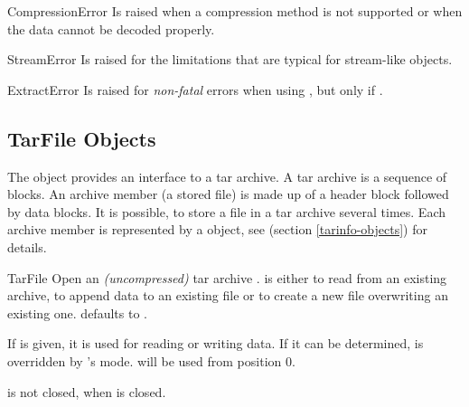 \begin{excdesc}{CompressionError}
    Is raised when a compression method is not supported or when the data
    cannot be decoded properly.
\end{excdesc}

\begin{excdesc}{StreamError}
    Is raised for the limitations that are typical for stream-like
     objects.
\end{excdesc}

\begin{excdesc}{ExtractError}
    Is raised for \emph{non-fatal} errors when using , but
    only if .
\end{excdesc}

\begin{seealso}

\end{seealso}


\subsection{TarFile Objects \label{tarfile-objects}}

The  object provides an interface to a tar archive. A tar
archive is a sequence of blocks. An archive member (a stored file) is made up
of a header block followed by data blocks. It is possible, to store a file in a
tar archive several times. Each archive member is represented by a
 object, see  (section
\ref{tarinfo-objects}) for details.

\begin{classdesc}{TarFile}{}
    Open an \emph{(uncompressed)} tar archive .
     is either  to read from an existing archive,
     to append data to an existing file or  to create a new
    file overwriting an existing one.  defaults to .

    If  is given, it is used for reading or writing data.
    If it can be determined,  is overridden by 's mode.
     will be used from position 0.
    \begin{notice}
         is not closed, when  is closed.
    \end{notice}
\end{classdesc}


